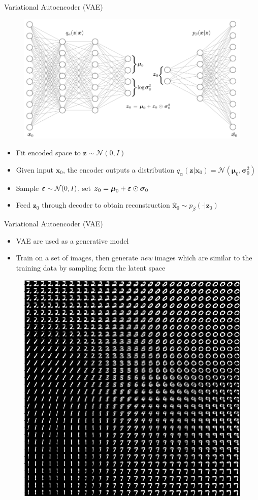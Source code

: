 \documentclass{beamer}
\def \e{\ensuremath \varepsilon}
\newcommand{\vect}[1]{\boldsymbol{#1}}
\theoremstyle{definition}
\begin{document}
\begin{frame}{Variational Autoencoder (VAE)}
\begin{figure}
  \includegraphics[width=.75\textwidth]{../img/vae_visual.png}
\end{figure}
\scriptsize
\begin{itemize}
  \item<1-> Fit encoded space to $\vect z \sim \mathcal{N}(0,I)$
  \item<1-> Given input $\vect x_0$, the encoder outputs a distribution $q_\alpha(\vect z | \vect x_0) = \mathcal{N}(\vect \mu_0, \vect \sigma_0^2)$
  \item<2-> Sample $\vect \e \sim \mathcal{N}(0,I)$, set $\vect z_0 = \vect \mu_0 + \vect \e \odot \vect \sigma_0$
  \item<2-> Feed $\vect z_0$ through decoder to obtain reconstruction $\hat{\vect x}_0 \sim p_\beta(\cdot | \vect z_0)$
\end{itemize}
\end{frame}

\begin{frame}{Variational Autoencoder (VAE)}
  \scriptsize
  \begin{itemize}
    \item VAE are used as a generative model
    \item Train on a set of images, then generate \textit{new} images which are similar to the training data by sampling form the latent space
  \end{itemize}
  \begin{figure}[h]
    \centering
    \includegraphics[width=.55\textwidth]{../img/vae_mnist_latent_gen.png}
  \end{figure}
\end{frame}
\end{document}

